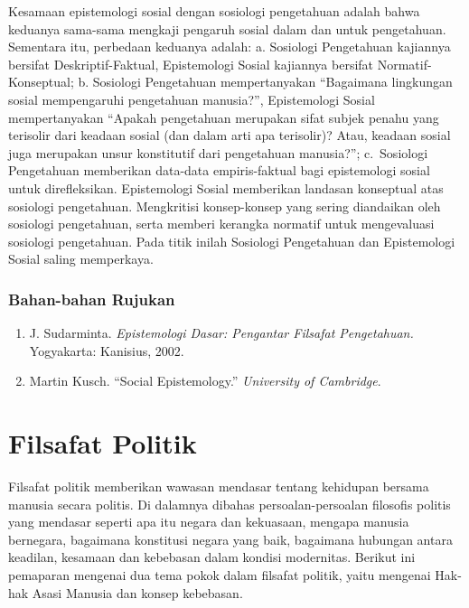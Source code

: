 \documentclass[11pt,twoside,a5paper,openany]{memoir}
\def\tightlist{}
\begin{document}
Kesamaan epistemologi sosial dengan sosiologi pengetahuan adalah bahwa
keduanya sama-sama mengkaji pengaruh sosial dalam dan untuk pengetahuan.
Sementara itu, perbedaan keduanya adalah: a. Sosiologi Pengetahuan
kajiannya bersifat Deskriptif-Faktual, Epistemologi Sosial kajiannya
bersifat Normatif-Konseptual; b. Sosiologi Pengetahuan mempertanyakan
``Bagaimana lingkungan sosial mempengaruhi pengetahuan manusia?'',
Epistemologi Sosial mempertanyakan ``Apakah pengetahuan merupakan sifat
subjek penahu yang terisolir dari keadaan sosial (dan dalam arti apa
terisolir)? Atau, keadaan sosial juga merupakan unsur konstitutif dari
pengetahuan manusia?''; c.~Sosiologi Pengetahuan memberikan data-data
empiris-faktual bagi epistemologi sosial untuk direfleksikan.
Epistemologi Sosial memberikan landasan konseptual atas sosiologi
pengetahuan. Mengkritisi konsep-konsep yang sering diandaikan oleh
sosiologi pengetahuan, serta memberi kerangka normatif untuk
mengevaluasi sosiologi pengetahuan. Pada titik inilah Sosiologi
Pengetahuan dan Epistemologi Sosial saling memperkaya.

\hypertarget{bahan-bahan-rujukan-1}{%
\subsection{Bahan-bahan Rujukan}\label{bahan-bahan-rujukan-1}}

\begin{enumerate}
\def\labelenumi{\arabic{enumi}.}
\tightlist
\item
  J. Sudarminta. \emph{Epistemologi Dasar: Pengantar Filsafat
  Pengetahuan.} Yogyakarta: Kanisius, 2002.
\item
  Martin Kusch. ``Social Epistemology.'' \emph{University of Cambridge}.
\end{enumerate}

\hypertarget{filsafat-politik}{%
\chapter{Filsafat Politik}\label{filsafat-politik}}

Filsafat politik memberikan wawasan mendasar tentang kehidupan bersama
manusia secara politis. Di dalamnya dibahas persoalan-persoalan
filosofis politis yang mendasar seperti apa itu negara dan kekuasaan,
mengapa manusia bernegara, bagaimana konstitusi negara yang baik,
bagaimana hubungan antara keadilan, kesamaan dan kebebasan dalam kondisi
modernitas. Berikut ini pemaparan mengenai dua tema pokok dalam filsafat
politik, yaitu mengenai Hak-hak Asasi Manusia dan konsep kebebasan.
\end{document}
